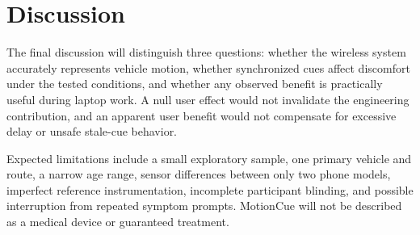 \section{Discussion}
\label{sec:discussion}

The final discussion will distinguish three questions: whether the wireless system accurately represents vehicle motion, whether synchronized cues affect discomfort under the tested conditions, and whether any observed benefit is practically useful during laptop work. A null user effect would not invalidate the engineering contribution, and an apparent user benefit would not compensate for excessive delay or unsafe stale-cue behavior.

Expected limitations include a small exploratory sample, one primary vehicle and route, a narrow age range, sensor differences between only two phone models, imperfect reference instrumentation, incomplete participant blinding, and possible interruption from repeated symptom prompts. MotionCue will not be described as a medical device or guaranteed treatment.
